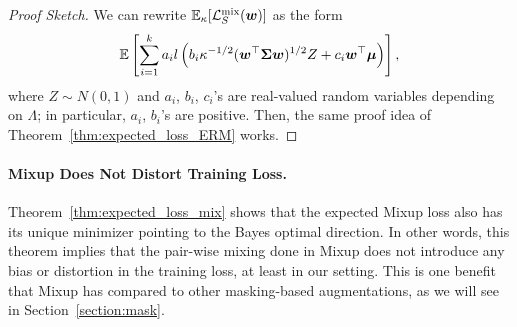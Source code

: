 \begin{proof}[Proof Sketch]
We can rewrite $\mathbb{E}_\kappa[ \mathcal{L}_S^\mathrm{mix} ({\bm{w}})]$ as the form
\begin{equation*}
\mathbb{E} \left[ \sum_{i=1}^k a_i l \left( b_i\kappa^{-1/2} ({\bm{w}}^\top {\bm{\Sigma}} {\bm{w}})^{1/2} Z   + c_i {\bm{w}}^\top {\bm{\mu}} \right)\right],
\end{equation*}
where $Z \sim N(0,1)$ and $a_i$, $b_i$, $c_i$'s are real-valued random variables depending on $\Lambda$; in particular, $a_i$, $b_i$'s are positive. Then, the same proof idea of Theorem~\ref{thm:expected_loss_ERM} works.
\vspace{-5pt}
\end{proof}

\paragraph{Mixup Does Not Distort Training Loss.}
Theorem~\ref{thm:expected_loss_mix} shows that the expected Mixup loss also has its unique minimizer pointing to the Bayes optimal direction. In other words, this theorem implies that the pair-wise mixing done in Mixup does not introduce any bias or distortion in the training loss, at least in our setting. This is one benefit that Mixup has compared to other masking-based augmentations, as we will see in Section~\ref{section:mask}.

